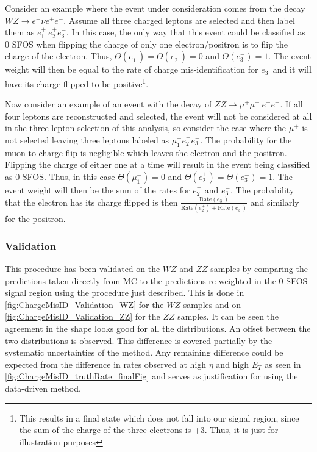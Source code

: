Consider an example where the event under consideration comes from the 
decay $WZ\rightarrow e^{+}\nu e^{+}e^{-}$. Assume all three charged leptons 
are selected and then label 
them as $e^{+}_1~e^{+}_2e^{-}_3$. In this case,
the only way that this event could be classified as 0 SFOS when 
flipping the charge of only one electron/positron is to flip the 
charge of the electron.
Thus, $\Theta(e^{+}_1)=\Theta(e^{+}_2)=0$ and $\Theta(e^{-}_3)=1$.  The event 
weight will then be equal to the rate of charge mis-identification 
for  $e^{-}_3$ and it will have its charge flipped 
to be positive\footnote{This results in a final state
which does not fall into our signal region, since the sum of the
charge of the three electrons is +3. Thus, it is just for illustration purposes}.

Now consider an example of an event with 
the decay of $ZZ\rightarrow \mu^{+}\mu^{-}~ e^{+}e^{-}$.
If all four leptons are reconstructed and selected, the event will not 
be considered at all in the three lepton selection of this analysis, so 
consider the case where the $\mu^{+}$ is not selected leaving three leptons 
labeled as $\mu^{-}_1 e^{+}_2 e^{-}_3$.  The probability for the muon to 
charge flip is negligible which leaves the electron and the positron. Flipping 
the charge of either one at a time will result in the event being 
classified as 0 SFOS.  Thus, in
this case $\Theta(\mu^{-}_1)=0$ and $\Theta(e^{+}_2)=\Theta(e^{-}_3)=1$. The 
event weight will then be the sum of the rates for $e^{+}_2$ and $e^{-}_3$.
The probability that the electron has its charge flipped is then 
$\frac{\textrm{Rate}(e^{-}_3) }{ \textrm{Rate}(e^{+}_2)+ \textrm{Rate}(e^{-}_3)}$ 
and similarly for the positron.

\subsubsection{Validation}
\label{sec:chargemisid_validation}
This procedure has been validated on the $WZ$ and $ZZ$ samples by comparing 
the predictions taken directly from MC to the predictions re-weighted in the 
0 SFOS signal region using the procedure just described. This is done in 
\fig\ref{fig:ChargeMisID_Validation_WZ} for the $WZ$ samples and on 
\fig\ref{fig:ChargeMisID_Validation_ZZ} for the $ZZ$ samples. It can be seen 
the agreement in the shape looks good for all the distributions. An offset 
between the two distributions is observed. This difference is covered partially by 
the systematic uncertainties of the method.  Any remaining difference could 
be expected from the difference in rates observed at high $\eta$ and 
high $E_{T}$ as seen in \fig\ref{fig:ChargeMisID_truthRate_finalFig} and 
serves as justification for using the data-driven method.



